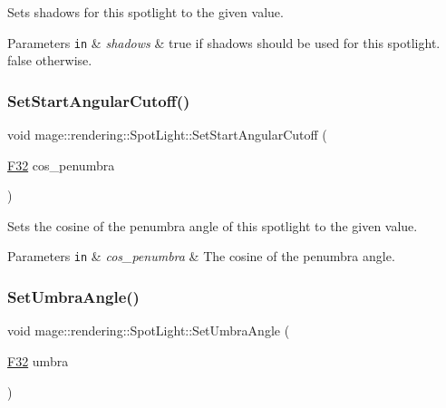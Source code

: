 Sets shadows for this spotlight to the given value.


\begin{DoxyParams}[1]{Parameters}
\mbox{\tt in}  & {\em shadows} & {\ttfamily true} if shadows should be used for this spotlight. {\ttfamily false} otherwise. \\
\hline
\end{DoxyParams}
\mbox{\label{classmage_1_1rendering_1_1_spot_light_a01db83a4c9e64ff48dc4152359abec84}} 
\subsubsection{\texorpdfstring{Set\+Start\+Angular\+Cutoff()}{SetStartAngularCutoff()}}
{\footnotesize\ttfamily void mage\+::rendering\+::\+Spot\+Light\+::\+Set\+Start\+Angular\+Cutoff (\begin{DoxyParamCaption}\item[{\mbox{\hyperlink{namespacemage_aa97e833b45f06d60a0a9c4fc22ae02c0}{F32}}}]{cos\+\_\+penumbra }\end{DoxyParamCaption})\hspace{0.3cm}{\ttfamily [noexcept]}}

Sets the cosine of the penumbra angle of this spotlight to the given value.


\begin{DoxyParams}[1]{Parameters}
\mbox{\tt in}  & {\em cos\+\_\+penumbra} & The cosine of the penumbra angle. \\
\hline
\end{DoxyParams}
\mbox{\label{classmage_1_1rendering_1_1_spot_light_a65c753804a53c6b9fc1c58bf036a75c1}} 
\subsubsection{\texorpdfstring{Set\+Umbra\+Angle()}{SetUmbraAngle()}}
{\footnotesize\ttfamily void mage\+::rendering\+::\+Spot\+Light\+::\+Set\+Umbra\+Angle (\begin{DoxyParamCaption}\item[{\mbox{\hyperlink{namespacemage_aa97e833b45f06d60a0a9c4fc22ae02c0}{F32}}}]{umbra }\end{DoxyParamCaption})\hspace{0.3cm}{\ttfamily [noexcept]}}

